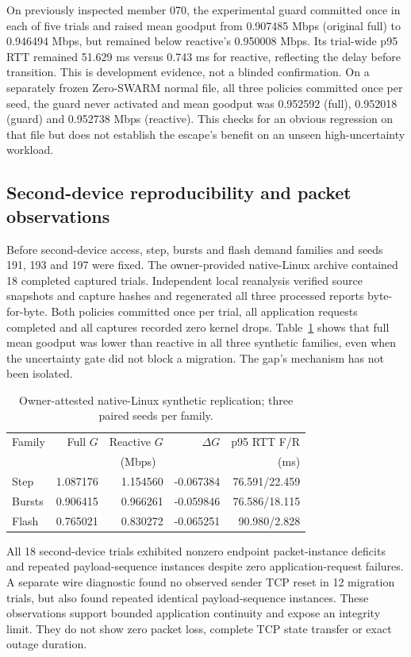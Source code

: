 \documentclass[11pt]{article}
\begin{document}
On previously inspected member 070, the experimental guard committed once in each of five trials and raised mean goodput from 0.907485 Mbps (original full) to 0.946494 Mbps, but remained below reactive's 0.950008 Mbps. Its trial-wide p95 RTT remained 51.629 ms versus 0.743 ms for reactive, reflecting the delay before transition. This is development evidence, not a blinded confirmation. On a separately frozen Zero-SWARM normal file, all three policies committed once per seed, the guard never activated and mean goodput was 0.952592 (full), 0.952018 (guard) and 0.952738 Mbps (reactive). This checks for an obvious regression on that file but does not establish the escape's benefit on an unseen high-uncertainty workload.

\subsection{Second-device reproducibility and packet observations}
Before second-device access, step, bursts and flash demand families and seeds 191, 193 and 197 were fixed. The owner-provided native-Linux archive contained 18 completed captured trials. Independent local reanalysis verified source snapshots and capture hashes and regenerated all three processed reports byte-for-byte. Both policies committed once per trial, all application requests completed and all captures recorded zero kernel drops. Table~\ref{tab:second} shows that full mean goodput was lower than reactive in all three synthetic families, even when the uncertainty gate did not block a migration. The gap's mechanism has not been isolated.

\begin{table}[t]
\centering\small
\caption{Owner-attested native-Linux synthetic replication; three paired seeds per family.}
\label{tab:second}
\begin{tabular}{lrrrr}
\toprule
Family & Full $G$ & Reactive $G$ & $\Delta G$ & p95 RTT F/R \\
 & \multicolumn{3}{c}{(Mbps)} & (ms) \\
\midrule
Step & 1.087176 & 1.154560 & -0.067384 & 76.591/22.459 \\
Bursts & 0.906415 & 0.966261 & -0.059846 & 76.586/18.115 \\
Flash & 0.765021 & 0.830272 & -0.065251 & 90.980/2.828 \\
\bottomrule
\end{tabular}
\end{table}

All 18 second-device trials exhibited nonzero endpoint packet-instance deficits and repeated payload-sequence instances despite zero application-request failures. A separate wire diagnostic found no observed sender TCP reset in 12 migration trials, but also found repeated identical payload-sequence instances. These observations support bounded application continuity and expose an integrity limit. They do not show zero packet loss, complete TCP state transfer or exact outage duration.
\end{document}
